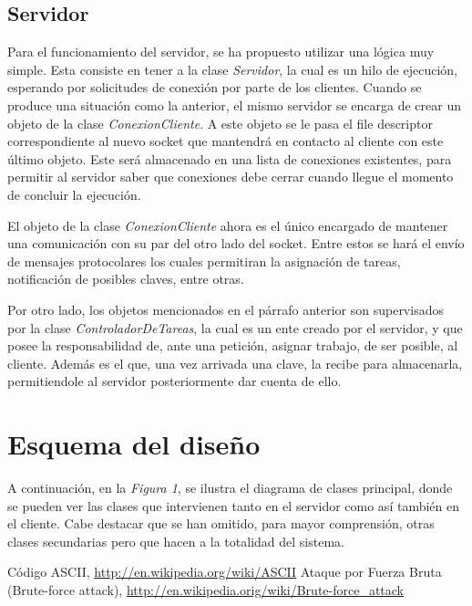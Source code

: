 \documentclass{article}
\begin{document}
\subsection{Servidor}

	Para el funcionamiento del servidor, se ha propuesto utilizar una lógica muy simple. Esta consiste en tener a la clase \textit{Servidor}, la cual es un hilo de ejecución, esperando por solicitudes de conexión por parte de los clientes. Cuando se produce una situación como la anterior, el mismo servidor se encarga de crear un objeto de la clase \textit{ConexionCliente}. A este objeto se le pasa el file descriptor correspondiente al nuevo socket que mantendrá en contacto al cliente con este último objeto. Este será almacenado en una lista de conexiones existentes, para permitir al servidor saber que conexiones debe cerrar cuando llegue el momento de concluir la ejecución.
	\par
	El objeto de la clase \textit{ConexionCliente} ahora es el único encargado de mantener una comunicación con su par del otro lado del socket. Entre estos se hará el envío de mensajes protocolares los cuales permitiran la asignación de tareas, notificación de posibles claves, entre otras. 
	\par
	Por otro lado, los objetos mencionados en el párrafo anterior son supervisados por la clase \textit{ControladorDeTareas}, la cual es un ente creado por el servidor, y que posee la responsabilidad de, ante una petición, asignar trabajo, de ser posible, al cliente. Además es el que, una vez arrivada una clave, la recibe para almacenarla, permitiendole al servidor posteriormente dar cuenta de ello.
	\bigskip\bigskip




\section{Esquema del diseño}

	A continuación, en la \textit{Figura 1}, se ilustra el diagrama de clases principal, donde se pueden ver las clases que intervienen tanto en el
	servidor como así también en el cliente. Cabe destacar que se han omitido,
	para mayor comprensión, otras clases secundarias pero que hacen a la totalidad del sistema. 
	\bigskip\bigskip\bigskip\bigskip



\begin{thebibliography}{99}

	 Código ASCII, \url{http://en.wikipedia.org/wiki/ASCII}
	 Ataque por Fuerza Bruta (Brute-force attack), \url{http://en.wikipedia.orig/wiki/Brute-force_attack}
	\end{thebibliography}
\end{document}
